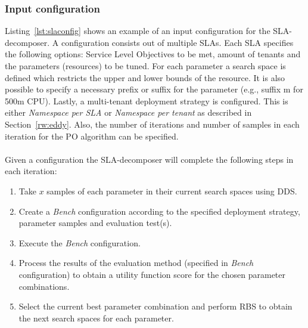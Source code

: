 \subsubsection{Input configuration}
\label{input-config}
Listing~\ref{lst:slaconfig} shows an example of an input configuration for the SLA-decomposer. A configuration consists out of multiple SLAs. Each SLA specifies the following options: Service Level Objectives to be met, amount of tenants and the parameters (resources) to be tuned. For each parameter a search space is defined which restricts the upper and lower bounds of the resource. It is also possible to specify a necessary prefix or suffix for the parameter (e.g., suffix m for 500m CPU). Lastly, a multi-tenant deployment strategy is configured. This is either \textit{Namespace per SLA} or \textit{Namespace per tenant} as described in Section~\ref{rw:eddy}. Also, the number of iterations and number of samples in each iteration for the PO algorithm can be specified.\\\\
Given a configuration the SLA-decomposer will complete the following steps in each iteration:
\begin{enumerate}
    \item Take $x$ samples of each parameter in their current search spaces using DDS.
    \item Create a \textit{Bench} configuration according to the specified deployment strategy, parameter samples and evaluation test(s).
    \item Execute the \textit{Bench} configuration.
    \item Process the results of the evaluation method (specified in \textit{Bench} configuration) to obtain a utility function score for the chosen parameter combinations.
    \item Select the current best parameter combination and perform RBS to obtain the next search spaces for each parameter.
\end{enumerate}
